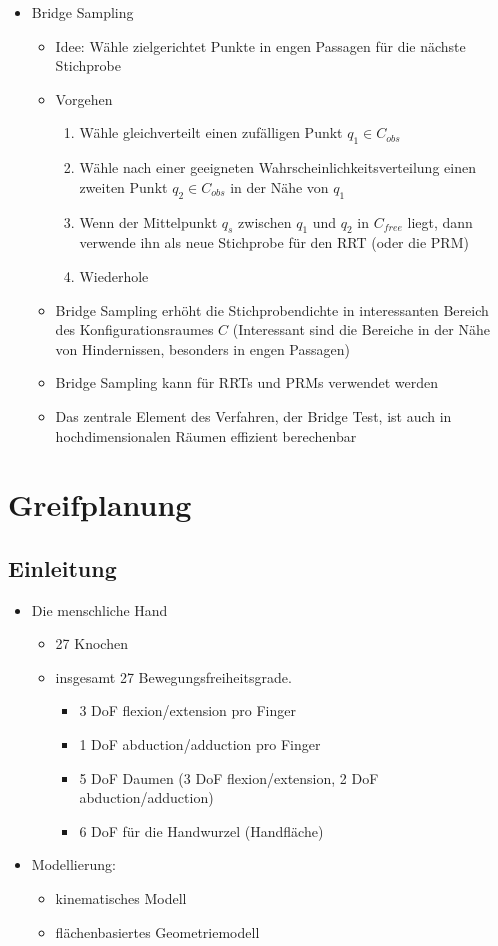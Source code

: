 \documentclass[paper=a4, fontsize=11pt]{scrartcl} %
\numberwithin{equation}{section} %
\numberwithin{figure}{section} %
\numberwithin{table}{section} %
\begin{document}
\begin{itemize}
\begin{itemize}
\end{itemize}
\item Bridge Sampling
\begin{itemize}
\item Idee: Wähle zielgerichtet Punkte in engen Passagen für die nächste Stichprobe
\item Vorgehen
\begin{enumerate}
\item Wähle gleichverteilt einen zufälligen Punkt $q_1 \in C_{obs}$
\item Wähle nach einer geeigneten Wahrscheinlichkeitsverteilung einen zweiten Punkt $q_2 \in C_{obs}$ in der Nähe von $q_1$
\item Wenn der Mittelpunkt $q_s$ zwischen $q_1$ und $q_2$ in $C_{free}$ liegt, dann verwende ihn als neue Stichprobe für den RRT (oder die PRM)
\item Wiederhole
\end{enumerate}
\item Bridge Sampling erhöht die Stichprobendichte in interessanten Bereich des Konfigurationsraumes $C$ (Interessant sind die Bereiche in der Nähe von Hindernissen, besonders in engen Passagen)
\item Bridge Sampling kann für RRTs und PRMs verwendet werden
\item Das zentrale Element des Verfahren, der Bridge Test, ist auch in hochdimensionalen Räumen effizient berechenbar
\end{itemize}
\end{itemize}

\section{Greifplanung}

\subsection{Einleitung}

\begin{itemize}
\item Die menschliche Hand
\begin{itemize}
\item 27 Knochen
\item insgesamt 27 Bewegungsfreiheitsgrade.
\begin{itemize}
\item 3 DoF flexion/extension pro Finger
\item 1 DoF abduction/adduction pro Finger
\item 5 DoF Daumen (3 DoF flexion/extension, 2 DoF abduction/adduction)
\item 6 DoF für die Handwurzel (Handfläche)
\end{itemize}
\end{itemize}
\item Modellierung:
\begin{itemize}
\item kinematisches Modell
\item flächenbasiertes Geometriemodell
\end{itemize}
\end{itemize}
\end{document}
